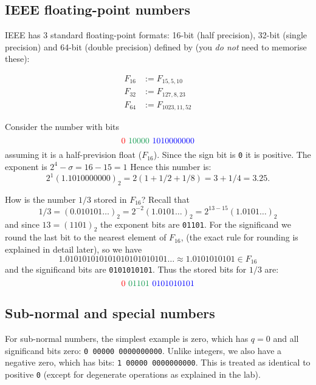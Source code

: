 \subsection{IEEE floating-point numbers}
\begin{definition}  IEEE has 3 standard floating-point formats: 16-bit (half precision), 32-bit (single precision) and 64-bit (double precision) defined by (you \emph{do not} need to memorise these):


\begin{align*}
F_{16} &:= F_{15,5,10} \\
F_{32} &:= F_{127,8,23} \\
F_{64} &:= F_{1023,11,52}
\end{align*}
\end{definition}

\begin{example} Consider the number with bits
\[
\red{0}\ \green{10000}\ \blue{1010000000}
\]
assuming it is a half-prevision float ($F_{16}$).  Since the sign bit is \texttt{0} it is positive. The exponent is $2^4 - \ensuremath{\sigma} = 16 - 15 = 1$ Hence this number is:
\[
2^1 (1.1010000000)_2 = 2 (1 + 1/2 + 1/8) = 3+1/4 = 3.25.
\]
\end{example}

\begin{example} How is the number $1/3$ stored in $F_{16}$? Recall that
\[
1/3 = (0.010101\ensuremath{\ldots})_2 = 2^{-2} (1.0101\ensuremath{\ldots})_2 = 2^{13-15} (1.0101\ensuremath{\ldots})_2
\]
and since $13 = (1101)_2$  the exponent bits are \texttt{01101}. For the significand we round the last bit to the nearest element of $F_{16}$,  (the exact rule for rounding is explained in detail later), so we have
\[
1.010101010101010101010101\ensuremath{\ldots}\approx 1.0101010101 \in F_{16} 
\]
and the significand bits are \texttt{0101010101}. Thus the stored bits for $1/3$ are:
\[
\red{0}\ \green{01101}\ \blue{0101010101}
\]
\end{example}

\subsection{Sub-normal and special numbers}
For sub-normal numbers, the simplest example is zero, which has $q=0$ and all significand bits zero: \texttt{0 00000 0000000000}. Unlike integers, we also have a negative zero, which has bits: \texttt{1 00000 0000000000}. This is treated as identical to positive \texttt{0} (except for degenerate operations as explained in the lab).


